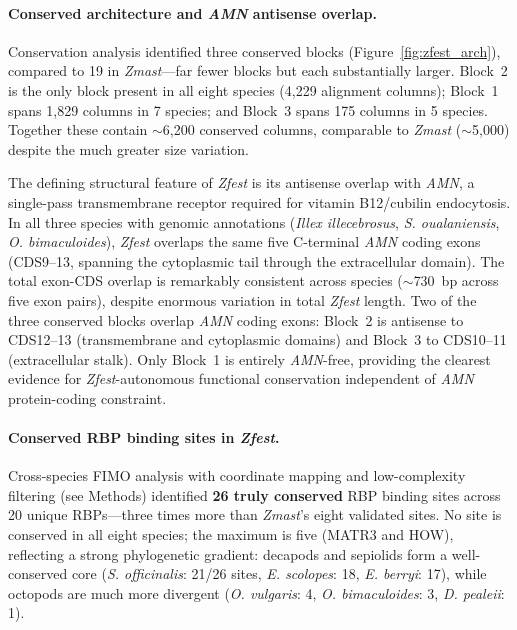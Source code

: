 \documentclass[12pt]{article}
\newcommand{\illex}{\textit{Illex illecebrosus}\xspace}
\begin{document}
\paragraph{Conserved architecture and \textit{AMN} antisense overlap.}
Conservation analysis identified three conserved blocks
(Figure~\ref{fig:zfest_arch}),
compared to 19 in \textit{Zmast}---far fewer blocks
but each substantially larger.
Block~2 is the only block present in all eight species
(4,229 alignment columns);
Block~1 spans 1,829 columns in 7 species;
and Block~3 spans 175 columns in 5 species.
Together these contain $\sim$6,200 conserved columns,
comparable to \textit{Zmast} ($\sim$5,000)
despite the much greater size variation.

The defining structural feature of \textit{Zfest}
is its antisense overlap with \textit{AMN},
a single-pass transmembrane receptor required for
vitamin B12/cubilin endocytosis.
In all three species with genomic annotations
(\illex, \textit{S. oualaniensis}, \textit{O. bimaculoides}),
\textit{Zfest} overlaps the same five C-terminal \textit{AMN} coding exons
(CDS9--13, spanning the cytoplasmic tail through the extracellular domain).
The total exon-CDS overlap is remarkably consistent
across species ($\sim$730~bp across five exon pairs),
despite enormous variation in total \textit{Zfest} length.
Two of the three conserved blocks overlap \textit{AMN} coding exons:
Block~2 is antisense to CDS12--13
(transmembrane and cytoplasmic domains)
and Block~3 to CDS10--11 (extracellular stalk).
Only Block~1 is entirely \textit{AMN}-free,
providing the clearest evidence
for \textit{Zfest}-autonomous functional conservation
independent of \textit{AMN} protein-coding constraint.

\paragraph{Conserved RBP binding sites in \textit{Zfest}.}
Cross-species FIMO analysis with coordinate mapping
and low-complexity filtering (see Methods)
identified \textbf{26 truly conserved} RBP binding sites
across 20 unique RBPs---three times more
than \textit{Zmast}'s eight validated sites.
No site is conserved in all eight species;
the maximum is five (MATR3 and HOW),
reflecting a strong phylogenetic gradient:
decapods and sepiolids form a well-conserved core
(\textit{S. officinalis}: 21/26 sites,
\textit{E. scolopes}: 18,
\textit{E. berryi}: 17),
while octopods are much more divergent
(\textit{O. vulgaris}: 4,
\textit{O. bimaculoides}: 3,
\textit{D. pealeii}: 1).
\end{document}
